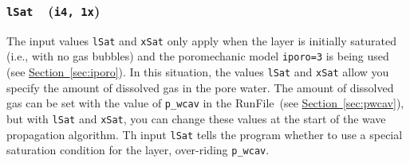\documentclass[letterpaper,11pt]{article}
\newcommand{\Var}[2]{\texttt{#1}\ \  (\texttt{#2})}
\newcommand{\RunFile}{\textsf{RunFile}}
\begin{document}
\subsubsection[\texttt{lSat}]{\Var{lSat}{i4, 1x}}\label{sec:lSat}
The input values \texttt{lSat} and \texttt{xSat} only apply
when the layer is initially saturated (i.e., with no gas bubbles)
and the poromechanic model \texttt{iporo=3} is being used
(see \hyperref[sec:iporo]{Section~\ref*{sec:iporo}}).
In this situation,
the values \texttt{lSat} and \texttt{xSat} allow you specify
the amount of dissolved gas in the pore water.
The amount of dissolved gas can be set with the
value of \texttt{p\_wcav} in the 
\RunFile\ (see \hyperref[sec:pwcav]{Section~\ref*{sec:pwcav}}),
but with \texttt{lSat} and \texttt{xSat}, you can change
these values at the start of the wave propagation algorithm.
Th input \texttt{lSat} tells the program
whether to use a special saturation condition for the layer,
over-riding \texttt{p\_wcav}.
%
\end{document}
